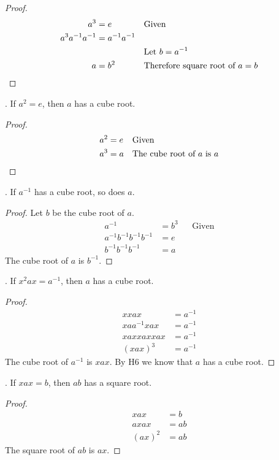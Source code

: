 \documentclass[twoside]{amsart}
\newcommand{\Blank}{\mathrel{\phantom{=}}}
\begin{document}
\begin{enumerate}[A.]
   \begin{proof}
      \begin{align*}
         a^3 & = e       && \text{Given} \\
	 a^3a^{-1}a^{-1} & = a^{-1}a^{-1}  \\
	                 & \Blank && \text{Let $b=a^{-1}$}\\
	 a               & = b^2 && \text{Therefore square root of $a=b$} 
	                     \qedhere
      \end{align*}
   \end{proof}

   . If $a^2=e$, then $a$ has a cube root.

   \begin{proof}
      \begin{align*}
         a^2   & = e     && \text{Given} \\
	 a^3   & = a     && \text{The cube root of $a$ is $a$}\qedhere
      \end{align*}
   \end{proof}

   . If $a^{-1}$ has a cube root, so does $a$.

   \begin{proof}
      Let $b$ be the cube root of $a$.
      \begin{align*}
         a^{-1}   & = b^3        && \text{Given}\\
	 a^{-1}b^{-1}b^{-1}b^{-1} & = e \\
	 b^{-1}b^{-1}b^{-1} & = a 
      \end{align*}
      The cube root of $a$ is $b^{-1}$.
   \end{proof}

   . If $x^2ax=a^{-1}$, then $a$ has a cube root. 

   \begin{proof}
      \begin{align*}
	 xxax      & = a^{-1} \\
	 xa a^{-1} xax & = a^{-1} \\
         xaxxaxxax & = a^{-1} \\
	 (xax)^3 & = a^{-1}
      \end{align*}
      The cube root of $a^{-1}$ is $xax$. By H6 we know that $a$ has
      a cube root.
   \end{proof}

   . If $xax=b$, then $ab$ has a square root.

   \begin{proof}
      \begin{align*}
         xax & = b \\
	 axax & = ab \\
	 (ax)^2 & = ab
      \end{align*}
      The square root of $ab$ is $ax$.
   \end{proof}

\end{enumerate}
\end{document}
